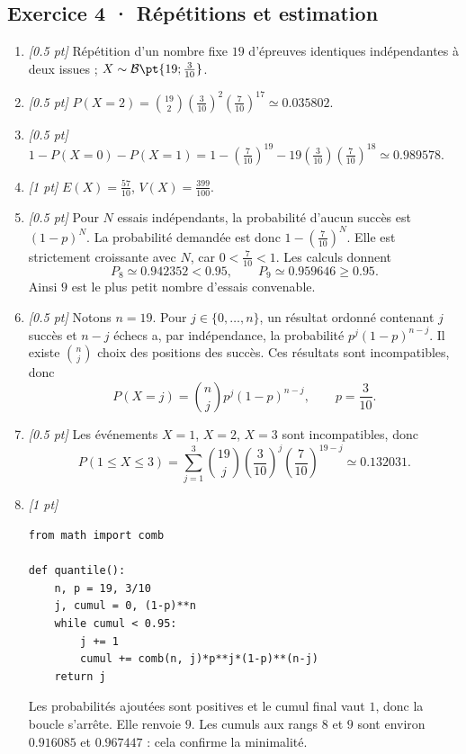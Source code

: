 \subsection*{Exercice 4 · Répétitions et estimation}\begin{enumerate}

\item \textit{[\num{0,5} pt]} Répétition d'un nombre fixe $19$ d'épreuves identiques indépendantes à deux issues ; $X\sim\mathcal B\pt{19;\frac{3}{10}}$.

\item \textit{[\num{0,5} pt]} $P(X=2)=\binom{19}2(\frac{3}{10})^2(\frac{7}{10})^{17}\simeq\num{0,035802}$.

\item \textit{[\num{0,5} pt]} $1-P(X=0)-P(X=1)=1-(\frac{7}{10})^{19}-19(\frac{3}{10})(\frac{7}{10})^{18}\simeq\num{0,989578}$.

\item \textit{[1 pt]} $E(X)=\frac{57}{10}$, $V(X)=\frac{399}{100}$.

\item \textit{[\num{0,5} pt]} Pour $N$ essais indépendants, la probabilité d'aucun succès est $(1-p)^N$. La probabilité demandée est donc $1-(\frac{7}{10})^N$. Elle est strictement croissante avec $N$, car $0<\frac{7}{10}<1$. Les calculs donnent
\[P_{8}\simeq\num{0,942352}<\num{0,95},\qquad P_{9}\simeq\num{0,959646}\ge\num{0,95}.\]
Ainsi $9$ est le plus petit nombre d'essais convenable.

\item \textit{[\num{0,5} pt]} Notons $n=19$. Pour $j\in\{0,\ldots,n\}$, un résultat ordonné contenant $j$ succès et $n-j$ échecs a, par indépendance, la probabilité $p^j(1-p)^{n-j}$. Il existe $\binom nj$ choix des positions des succès. Ces résultats sont incompatibles, donc
\[P(X=j)=\binom nj p^j(1-p)^{n-j},\qquad p=\frac{3}{10}.\]

\item \textit{[\num{0,5} pt]} Les événements $X=1$, $X=2$, $X=3$ sont incompatibles, donc
\[P(1\le X\le3)=\sum_{j=1}^3\binom{19}j(\frac{3}{10})^j(\frac{7}{10})^{19-j}\simeq\num{0,132031}.\]


\item \textit{[1 pt]} 
\begin{lstlisting}
from math import comb

def quantile():
    n, p = 19, 3/10
    j, cumul = 0, (1-p)**n
    while cumul < 0.95:
        j += 1
        cumul += comb(n, j)*p**j*(1-p)**(n-j)
    return j
\end{lstlisting}
Les probabilités ajoutées sont positives et le cumul final vaut $1$, donc la boucle s'arrête. Elle renvoie $9$. Les cumuls aux rangs $8$ et $9$ sont environ $\num{0,916085}$ et $\num{0,967447}$ : cela confirme la minimalité.

\end{enumerate}

